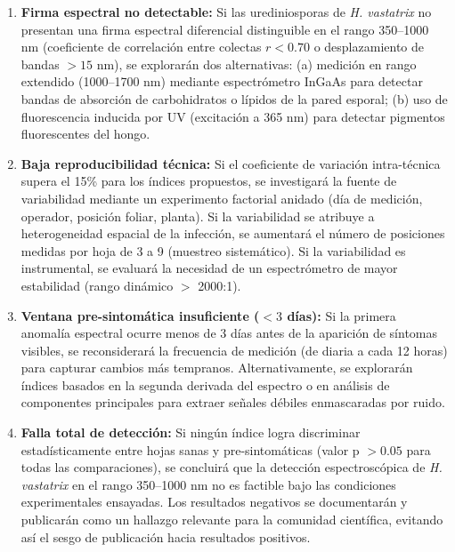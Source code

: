 \documentclass[12pt, a4paper]{article}
\begin{document}
	\begin{enumerate}
		\item \textbf{Firma espectral no detectable:} Si las urediniosporas de \textit{H. vastatrix} no presentan una firma espectral diferencial distinguible en el rango 350--1000 nm (coeficiente de correlación entre colectas $r < 0.70$ o desplazamiento de bandas $> 15$ nm), se explorarán dos alternativas: (a) medición en rango extendido (1000--1700 nm) mediante espectrómetro InGaAs para detectar bandas de absorción de carbohidratos o lípidos de la pared esporal; (b) uso de fluorescencia inducida por UV (excitación a 365 nm) para detectar pigmentos fluorescentes del hongo.
		
		\item \textbf{Baja reproducibilidad técnica:} Si el coeficiente de variación intra-técnica supera el 15\% para los índices propuestos, se investigará la fuente de variabilidad mediante un experimento factorial anidado (día de medición, operador, posición foliar, planta). Si la variabilidad se atribuye a heterogeneidad espacial de la infección, se aumentará el número de posiciones medidas por hoja de 3 a 9 (muestreo sistemático). Si la variabilidad es instrumental, se evaluará la necesidad de un espectrómetro de mayor estabilidad (rango dinámico $>$ 2000:1).
		
		\item \textbf{Ventana pre-sintomática insuficiente ($< 3$ días):} Si la primera anomalía espectral ocurre menos de 3 días antes de la aparición de síntomas visibles, se reconsiderará la frecuencia de medición (de diaria a cada 12 horas) para capturar cambios más tempranos. Alternativamente, se explorarán índices basados en la segunda derivada del espectro o en análisis de componentes principales para extraer señales débiles enmascaradas por ruido.
		
		\item \textbf{Falla total de detección:} Si ningún índice logra discriminar estadísticamente entre hojas sanas y pre-sintomáticas (valor p $> 0.05$ para todas las comparaciones), se concluirá que la detección espectroscópica de \textit{H. vastatrix} en el rango 350--1000 nm no es factible bajo las condiciones experimentales ensayadas. Los resultados negativos se documentarán y publicarán como un hallazgo relevante para la comunidad científica, evitando así el sesgo de publicación hacia resultados positivos.
	\end{enumerate}
	
	
\end{document}
